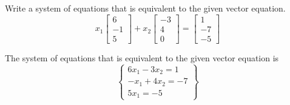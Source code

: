 \documentclass{mathhomework}
\begin{document}
\begin{problem}[1.3\#5]
    Write a system of equations that is equivalent to the given vector equation.
    \begin{equation*}
        x_1\begin{bmatrix}
            6 \\ -1 \\ 5
        \end{bmatrix}
        + x_2\begin{bmatrix}
            -3 \\ 4 \\ 0
        \end{bmatrix}
        = \begin{bmatrix}
            1 \\ -7 \\ -5
        \end{bmatrix}
    \end{equation*}

    \begin{solution}
        The system of equations that is equivalent to the given vector equation is
        \begin{equation*}
            \begin{Bmatrix}
                6x_1 - 3x_2 = 1 \\
                -x_1 + 4x_2 = -7 \\
                5x_1 = -5
            \end{Bmatrix}
        \end{equation*}
    \end{solution}
\end{problem}
\end{document}
